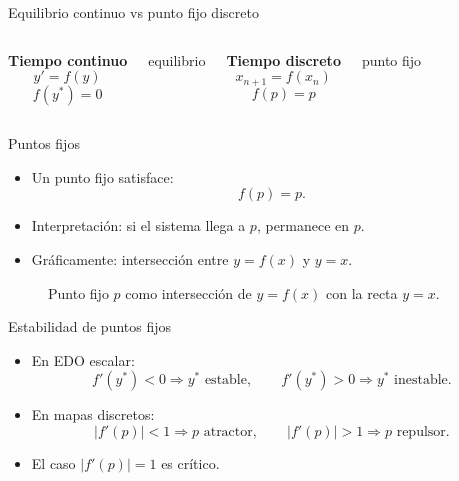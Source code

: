 \documentclass[aspectratio=169,11pt]{beamer}
\begin{document}
\begin{frame}{Equilibrio continuo vs punto fijo discreto}
    \begin{columns}
        \textbf{Tiempo continuo}
        \[
        y'=f(y)
        \]
        \[
        f(y^*)=0
        \]
        \begin{center}
        equilibrio
        \end{center}
        \textbf{Tiempo discreto}
        \[
        x_{n+1}=f(x_n)
        \]
        \[
        f(p)=p
        \]
        \begin{center}
        punto fijo
        \end{center}
    \end{columns}
\end{frame}

\begin{frame}{Puntos fijos}
    \begin{itemize}
        \item Un punto fijo satisface:
        \[
        f(p)=p.
        \]
        \item Interpretaci\'on: si el sistema llega a $p$, permanece en $p$.
        \item Gr\'aficamente: intersecci\'on entre $y=f(x)$ y $y=x$.
    \end{itemize}
    \begin{figure}
    \centering
    \caption{Punto fijo $p$ como intersecci\'on de $y=f(x)$ con la recta $y=x$.}
    \end{figure}
\end{frame}

\begin{frame}{Estabilidad de puntos fijos}
    \begin{itemize}
        \item En EDO escalar:
        \[
        f'(y^*)<0 \Rightarrow y^* \text{ estable}, \qquad
        f'(y^*)>0 \Rightarrow y^* \text{ inestable}.
        \]
        \item En mapas discretos:
        \[
        |f'(p)|<1 \Rightarrow p \text{ atractor}, \qquad
        |f'(p)|>1 \Rightarrow p \text{ repulsor}.
        \]
        \item El caso $|f'(p)|=1$ es cr\'itico.
    \end{itemize}
\end{frame}
\end{document}
